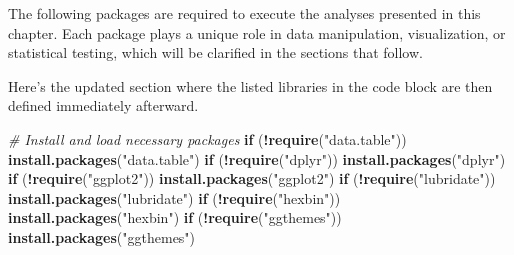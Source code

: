 \documentclass[
]{book}
\newenvironment{Shaded}{\begin{snugshade}}{\end{snugshade}}
\newcommand{\CommentTok}[1]{\textcolor[rgb]{0.56,0.35,0.01}{\textit{#1}}}
\newcommand{\ControlFlowTok}[1]{\textcolor[rgb]{0.13,0.29,0.53}{\textbf{#1}}}
\newcommand{\FunctionTok}[1]{\textcolor[rgb]{0.13,0.29,0.53}{\textbf{#1}}}
\newcommand{\NormalTok}[1]{#1}
\newcommand{\SpecialCharTok}[1]{\textcolor[rgb]{0.81,0.36,0.00}{\textbf{#1}}}
\newcommand{\StringTok}[1]{\textcolor[rgb]{0.31,0.60,0.02}{#1}}
\begin{document}
The following packages are required to execute the analyses presented in this chapter. Each package plays a unique role in data manipulation, visualization, or statistical testing, which will be clarified in the sections that follow.

Here's the updated section where the listed libraries in the code block are then defined immediately afterward.

\begin{Shaded}
\begin{Highlighting}[]
\CommentTok{\# Install and load necessary packages}
\ControlFlowTok{if}\NormalTok{ (}\SpecialCharTok{!}\FunctionTok{require}\NormalTok{(}\StringTok{"data.table"}\NormalTok{)) }\FunctionTok{install.packages}\NormalTok{(}\StringTok{"data.table"}\NormalTok{)}
\ControlFlowTok{if}\NormalTok{ (}\SpecialCharTok{!}\FunctionTok{require}\NormalTok{(}\StringTok{"dplyr"}\NormalTok{)) }\FunctionTok{install.packages}\NormalTok{(}\StringTok{"dplyr"}\NormalTok{)}
\ControlFlowTok{if}\NormalTok{ (}\SpecialCharTok{!}\FunctionTok{require}\NormalTok{(}\StringTok{"ggplot2"}\NormalTok{)) }\FunctionTok{install.packages}\NormalTok{(}\StringTok{"ggplot2"}\NormalTok{)}
\ControlFlowTok{if}\NormalTok{ (}\SpecialCharTok{!}\FunctionTok{require}\NormalTok{(}\StringTok{"lubridate"}\NormalTok{)) }\FunctionTok{install.packages}\NormalTok{(}\StringTok{"lubridate"}\NormalTok{)}
\ControlFlowTok{if}\NormalTok{ (}\SpecialCharTok{!}\FunctionTok{require}\NormalTok{(}\StringTok{"hexbin"}\NormalTok{)) }\FunctionTok{install.packages}\NormalTok{(}\StringTok{"hexbin"}\NormalTok{)}
\ControlFlowTok{if}\NormalTok{ (}\SpecialCharTok{!}\FunctionTok{require}\NormalTok{(}\StringTok{"ggthemes"}\NormalTok{)) }\FunctionTok{install.packages}\NormalTok{(}\StringTok{"ggthemes"}\NormalTok{)}
\end{Highlighting}
\end{Shaded}
\end{document}
